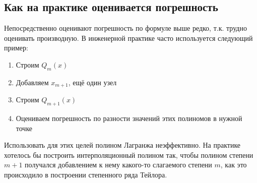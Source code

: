 \documentclass[a4paper,11pt]{article}
\begin{document}
\newpage
  \subsection{Как на практике оценивается погрешность}
  Непосредственно оценивают погрешность по формуле выше редко, т.к. трудно оценивать производную. В инженерной практике часто используется следующий пример:
  \begin{enumerate}
    \item Строим $Q_m(x)$
    \item Добавляем $x_{m+1}$, ещё один узел
    \item Строим $Q_{m+1}(x)$
    \item Оцениваем погрешность по разности значений этих полиномов в нужной точке
  \end{enumerate}
  Использовать для этих целей полином Лагранжа неэффективно. На практике хотелось бы построить интерполяционный полином так, чтобы полином степени $m+1$ получался
    добавлением к нему какого-то слагаемого степени $m$, как это происходило в построении степенного ряда Тейлора.

\newpage
\end{document}
